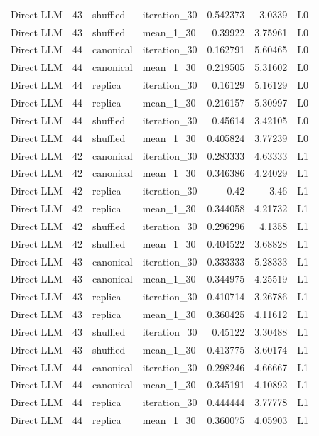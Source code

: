 \begin{table}[htbp!]
\begin{tabular}{lrllrrl}
Direct LLM & 43 & shuffled & iteration\_30 & 0.542373 & 3.0339 & L0 \\
Direct LLM & 43 & shuffled & mean\_1\_30 & 0.39922 & 3.75961 & L0 \\
Direct LLM & 44 & canonical & iteration\_30 & 0.162791 & 5.60465 & L0 \\
Direct LLM & 44 & canonical & mean\_1\_30 & 0.219505 & 5.31602 & L0 \\
Direct LLM & 44 & replica & iteration\_30 & 0.16129 & 5.16129 & L0 \\
Direct LLM & 44 & replica & mean\_1\_30 & 0.216157 & 5.30997 & L0 \\
Direct LLM & 44 & shuffled & iteration\_30 & 0.45614 & 3.42105 & L0 \\
Direct LLM & 44 & shuffled & mean\_1\_30 & 0.405824 & 3.77239 & L0 \\
Direct LLM & 42 & canonical & iteration\_30 & 0.283333 & 4.63333 & L1 \\
Direct LLM & 42 & canonical & mean\_1\_30 & 0.346386 & 4.24029 & L1 \\
Direct LLM & 42 & replica & iteration\_30 & 0.42 & 3.46 & L1 \\
Direct LLM & 42 & replica & mean\_1\_30 & 0.344058 & 4.21732 & L1 \\
Direct LLM & 42 & shuffled & iteration\_30 & 0.296296 & 4.1358 & L1 \\
Direct LLM & 42 & shuffled & mean\_1\_30 & 0.404522 & 3.68828 & L1 \\
Direct LLM & 43 & canonical & iteration\_30 & 0.333333 & 5.28333 & L1 \\
Direct LLM & 43 & canonical & mean\_1\_30 & 0.344975 & 4.25519 & L1 \\
Direct LLM & 43 & replica & iteration\_30 & 0.410714 & 3.26786 & L1 \\
Direct LLM & 43 & replica & mean\_1\_30 & 0.360425 & 4.11612 & L1 \\
Direct LLM & 43 & shuffled & iteration\_30 & 0.45122 & 3.30488 & L1 \\
Direct LLM & 43 & shuffled & mean\_1\_30 & 0.413775 & 3.60174 & L1 \\
Direct LLM & 44 & canonical & iteration\_30 & 0.298246 & 4.66667 & L1 \\
Direct LLM & 44 & canonical & mean\_1\_30 & 0.345191 & 4.10892 & L1 \\
Direct LLM & 44 & replica & iteration\_30 & 0.444444 & 3.77778 & L1 \\
Direct LLM & 44 & replica & mean\_1\_30 & 0.360075 & 4.05903 & L1 \\

\end{tabular}
\end{table}
